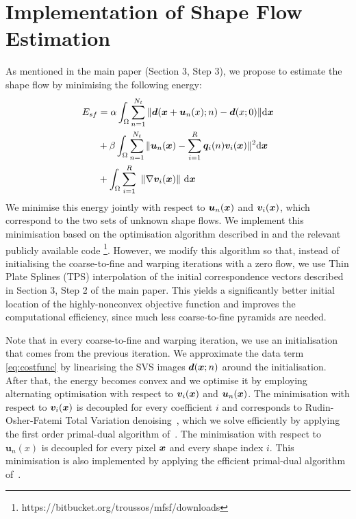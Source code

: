 \section{Implementation of Shape Flow Estimation}
\label{sec:cost_function}


As mentioned in the main paper (Section 3, Step 3), we propose to estimate the shape flow by minimising the following energy:
\begin{align}
E_{sf} & =\alpha
\int_{\Omega}\sum_{n=1}^{N_t} \|\bm{d}(\bm{x}+\bm{u}_n(x);n)-\bm{d}(x;0)\| \mathrm{d} \bm{x} \\
    &+ \beta \int_{\Omega}\sum_{n=1}^{N_t}\|\bm{u}_n(\bm{x})-\sum_{i=1}^R\bm{q}_i(n)\bm{v}_i(\bm{x})\|^2 \mathrm{d} \bm{x} \\
    &+
\int_\Omega  \sum_{i=1}^R \,\, \left \|    \nabla \bm{v}_i(\bm{x})    \right \|  \,\mathrm{d} \bm{x}
\end{align}
We minimise this energy jointly with respect to $\bm{u}_n(\bm{x})$ and $\bm{v}_i(\bm{x})$, which correspond to the
two sets of unknown shape flows.
We implement this minimisation based on the optimisation algorithm described in \cite{Garg:2013hu} and the relevant publicly available code \footnote{https://bitbucket.org/troussos/mfsf/downloads}.
However, we modify this algorithm so that, instead of initialising the coarse-to-fine and warping iterations with a zero flow, we use Thin Plate Splines (TPS) \cite{Bookstein1989} interpolation of the initial correspondence vectors described in Section 3, Step 2 of the main paper.
This yields a significantly better initial location of the highly-nonconvex objective function and improves the computational efficiency, since much less coarse-to-fine pyramids are needed.

Note that in every coarse-to-fine and warping iteration, we use an initialisation that comes from the previous iteration. We approximate the data term \eqref{eq:costfunc} by linearising the SVS images $\bm{d}(\bm{x};n)$ around the initialisation. After that, the energy becomes convex and we optimise it by employing alternating optimisation with respect to $\bm{v}_i(\bm{x})$ and $\bm{u}_n(\bm{x})$. The minimisation with respect to $\bm{v}_i(\bm{x})$ is decoupled for every coefficient $i$ and corresponds to Rudin-Osher-Fatemi Total Variation denoising~\cite{rudin92}, which we solve efficiently by applying the first order primal-dual algorithm of~\cite{Chambolle:Pock:JMIV2011}. The minimisation with respect to $\bm{u}_n(x)$ is decoupled for every pixel $\bm{x}$ and every shape index $i$. This minimisation is also implemented by applying the efficient primal-dual algorithm of~\cite{Chambolle:Pock:JMIV2011}.

